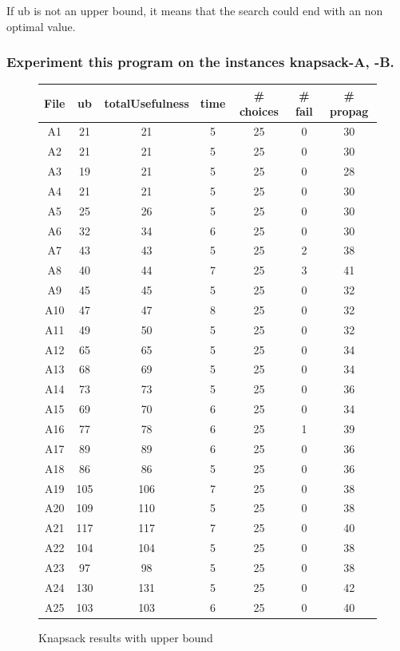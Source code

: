 \documentclass[a4paper ,12pt,french]{article}
\begin{document}
If ub is not an upper bound, it means that the search could end with an non optimal value.

\subsubsection{Experiment this program on the instances knapsack-A, -B. }




\begin{figure}[!ht]
\begin{tabular}{|c|c|c|c|c|c|c|}     \hline
File & ub & totalUsefulness & time & \# choices & \# fail & \# propag \\ \hline 
A1&21&21&5&25&0&30   \\ \hline
A2&21&21&5&25&0&30   \\ \hline
A3&19&21&5&25&0&28   \\ \hline
A4&21&21&5&25&0&30   \\ \hline
A5&25&26&5&25&0&30   \\ \hline
A6&32&34&6&25&0&30   \\ \hline
A7&43&43&5&25&2&38   \\ \hline
A8&40&44&7&25&3&41   \\ \hline
A9&45&45&5&25&0&32   \\ \hline
A10&47&47&8&25&0&32  \\ \hline
A11&49&50&5&25&0&32  \\ \hline
A12&65&65&5&25&0&34  \\ \hline
A13&68&69&5&25&0&34  \\ \hline
A14&73&73&5&25&0&36  \\ \hline
A15&69&70&6&25&0&34  \\ \hline
A16&77&78&6&25&1&39  \\ \hline
A17&89&89&6&25&0&36  \\ \hline
A18&86&86&5&25&0&36  \\ \hline
A19&105&106&7&25&0&38\\ \hline
A20&109&110&5&25&0&38\\ \hline
A21&117&117&7&25&0&40\\ \hline
A22&104&104&5&25&0&38\\ \hline
A23&97&98&5&25&0&38  \\ \hline
A24&130&131&5&25&0&42\\ \hline
A25&103&103&6&25&0&40\\ \hline
\end{tabular}
\caption{Knapsack results with upper bound}
\label{FIGA}
\end{figure}
\end{document}
